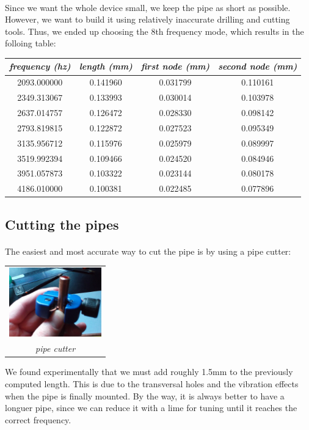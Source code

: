 \documentclass[12pt]{article}
\begin{document}
\paragraph{} Since we want the whole device small, we keep the pipe as short
as possible. However, we want to build it using relatively inaccurate
drilling and cutting tools. Thus, we ended up choosing the 8th frequency mode,
which results in the folloing table:
\begin{center}
  \begin{tabular}{|c|c|c|c|}
    \hline
    \textit{frequency (hz)} &
    \textit{length (mm)} &
    \textit{first node (mm)} &
    \textit{second node (mm)} \\
    \hline
    2093.000000 & 0.141960 & 0.031799 & 0.110161 \\
    \hline
    2349.313067 & 0.133993 & 0.030014 & 0.103978 \\
    \hline
    2637.014757 & 0.126472 & 0.028330 & 0.098142 \\
    \hline
    2793.819815 & 0.122872 & 0.027523 & 0.095349 \\
    \hline
    3135.956712 & 0.115976 & 0.025979 & 0.089997 \\
    \hline
    3519.992394 & 0.109466 & 0.024520 & 0.084946 \\
    \hline
    3951.057873 & 0.103322 & 0.023144 & 0.080178 \\
    \hline
    4186.010000 & 0.100381 & 0.022485 & 0.077896 \\
    \hline
\end{tabular}
\end{center}

\subsection{Cutting the pipes}
\paragraph{} The easiest and most accurate way to cut the pipe is by using a pipe cutter:
\begin{center}
  \begin{tabular}{c}
    \includegraphics[keepaspectratio=true, width=40mm]{../pics/tools/pipe_cutter_scaled.jpg}
    \\
    \smallskip
    \tiny{\textit{pipe cutter}}
  \end{tabular}
\end{center}
We found experimentally that we must add roughly 1.5mm to the previously computed length.
This is due to the transversal holes and the vibration effects when the pipe is finally
mounted. By the way, it is always better to have a longuer pipe, since we can reduce it
with a lime for tuning until it reaches the correct frequency.
\end{document}
